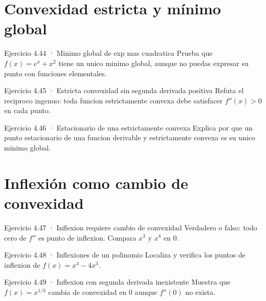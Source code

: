 \documentclass[10pt,a4paper,oneside,openany]{book}
\begin{document}
\section{Convexidad estricta y mínimo global}
\begin{PSevenExerciseFixed}{Ejercicio 4.44 · Minimo global de exp mas cuadratica}
Prueba que \(f(x)=e^x+x^{2}\) tiene un unico minimo global, aunque no puedas expresar su punto con funciones elementales.
\end{PSevenExerciseFixed}
\begin{PSevenExerciseFixed}{Ejercicio 4.45 · Estricta convexidad sin segunda derivada positiva}
Refuta el reciproco ingenuo: toda funcion estrictamente convexa debe satisfacer \(f''(x)>0\) en cada punto.
\end{PSevenExerciseFixed}
\begin{PSevenExerciseFixed}{Ejercicio 4.46 · Estacionario de una estrictamente convexa}
Explica por que un punto estacionario de una funcion derivable y estrictamente convexa es su unico minimo global.
\end{PSevenExerciseFixed}
\section{Inflexión como cambio de convexidad}
\begin{PSevenExerciseFixed}{Ejercicio 4.47 · Inflexion requiere cambio de convexidad}
Verdadero o falso: todo cero de \(f''\) es punto de inflexion. Compara \(x^{3}\) y \(x^{4}\) en \(0\).
\end{PSevenExerciseFixed}
\begin{PSevenExerciseFixed}{Ejercicio 4.48 · Inflexiones de un polinomio}
Localiza y verifica los puntos de inflexion de \(f(x)=x^{4}-4x^{3}\).
\end{PSevenExerciseFixed}
\begin{PSevenExerciseFixed}{Ejercicio 4.49 · Inflexion con segunda derivada inexistente}
Muestra que \(f(x)=x^{1/3}\) cambia de convexidad en \(0\) aunque \(f''(0)\) no exista.
\end{PSevenExerciseFixed}
\end{document}
